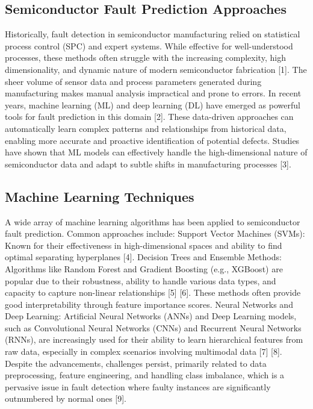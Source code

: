\documentclass[12pt,oneside]{article}
\begin{document}
\subsection{Semiconductor Fault Prediction Approaches}
Historically, fault detection in semiconductor manufacturing relied on statistical process control (SPC) and expert systems. While effective for well-understood processes, these methods often struggle with the increasing complexity, high dimensionality, and dynamic nature of modern semiconductor fabrication [1]. The sheer volume of sensor data and process parameters generated during manufacturing makes manual analysis impractical and prone to errors.
In recent years, machine learning (ML) and deep learning (DL) have emerged as powerful tools for fault prediction in this domain [2]. These data-driven approaches can automatically learn complex patterns and relationships from historical data, enabling more accurate and proactive identification of potential defects. Studies have shown that ML models can effectively handle the high-dimensional nature of semiconductor data and adapt to subtle shifts in manufacturing processes [3].


\subsection{Machine Learning Techniques}
A wide array of machine learning algorithms has been applied to semiconductor fault prediction. Common approaches include:
Support Vector Machines (SVMs): Known for their effectiveness in high-dimensional spaces and ability to find optimal separating hyperplanes [4].
Decision Trees and Ensemble Methods: Algorithms like Random Forest and Gradient Boosting (e.g., XGBoost) are popular due to their robustness, ability to handle various data types, and capacity to capture non-linear relationships [5] [6]. These methods often provide good interpretability through feature importance scores.
Neural Networks and Deep Learning: Artificial Neural Networks (ANNs) and Deep Learning models, such as Convolutional Neural Networks (CNNs) and Recurrent Neural Networks (RNNs), are increasingly used for their ability to learn hierarchical features from raw data, especially in complex scenarios involving multimodal data [7] [8].
Despite the advancements, challenges persist, primarily related to data preprocessing, feature engineering, and handling class imbalance, which is a pervasive issue in fault detection where faulty instances are significantly outnumbered by normal ones [9].
\end{document}

